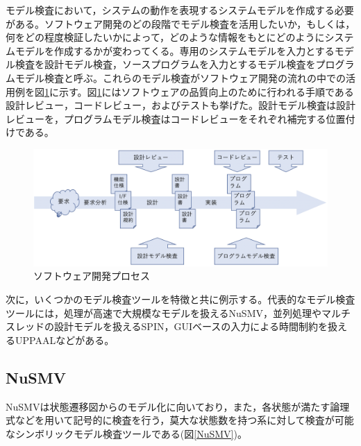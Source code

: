 \documentclass{tpu-sotu}
\begin{document}
	モデル検査において，システムの動作を表現するシステムモデルを作成する必要がある。ソフトウェア開発のどの段階でモデル検査を活用したいか，もしくは，何をどの程度検証したいかによって，どのような情報をもとにどのようにシステムモデルを作成するかが変わってくる。専用のシステムモデルを入力とするモデル検査を設計モデル検査，ソースプログラムを入力とするモデル検査をプログラムモデル検査と呼ぶ。これらのモデル検査がソフトウェア開発の流れの中での活用例を図\ref{develP}に示す。図\ref{develP}にはソフトウェアの品質向上のために行われる手順である設計レビュー，コードレビュー，およびテストも挙げた。設計モデル検査は設計レビューを，プログラムモデル検査はコードレビューをそれぞれ補完する位置付けである。
	\begin{figure}[htbp]
	\centering
	\includegraphics[width=150mm]{developmentProcess.png}
	\caption{ソフトウェア開発プロセス}
	\label{develP}
	\end{figure}
	
	次に，いくつかのモデル検査ツールを特徴と共に例示する。代表的なモデル検査ツールには，処理が高速で大規模なモデルを扱えるNuSMV\cite{Nu}，並列処理やマルチスレッドの設計モデルを扱えるSPIN\cite{s1}，GUIベースの入力による時間制約を扱えるUPPAALなどがある。
	\subsection{NuSMV}
	
	NuSMVは状態遷移図からのモデル化に向いており，また，各状態が満たす論理式などを用いて記号的に検査を行う，莫大な状態数を持つ系に対して検査が可能なシンボリックモデル検査ツールである(図\ref{NuSMV})。
		
\end{document}
